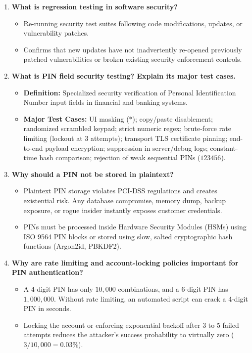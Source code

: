 \begin{enumerate}[label=\textbf{Q\arabic*.,resume},leftmargin=1.2cm]
\item \textbf{What is regression testing in software security?}
\begin{itemize}
\item Re-running security test suites following code modifications, updates, or vulnerability patches.
\item Confirms that new updates have not inadvertently re-opened previously patched vulnerabilities or broken existing security enforcement controls.
\end{itemize}

\item \textbf{What is PIN field security testing? Explain its major test cases.}
\begin{itemize}
\item \textbf{Definition:} Specialized security verification of Personal Identification Number input fields in financial and banking systems.
\item \textbf{Major Test Cases:} UI masking ($\ast$); copy/paste disablement; randomized scrambled keypad; strict numeric regex; brute-force rate limiting (lockout at 3 attempts); transport TLS certificate pinning; end-to-end payload encryption; suppression in server/debug logs; constant-time hash comparison; rejection of weak sequential PINs ($123456$).
\end{itemize}

\item \textbf{Why should a PIN not be stored in plaintext?}
\begin{itemize}
\item Plaintext PIN storage violates PCI-DSS regulations and creates existential risk. Any database compromise, memory dump, backup exposure, or rogue insider instantly exposes customer credentials.
\item PINs must be processed inside Hardware Security Modules (HSMs) using ISO 9564 PIN blocks or stored using slow, salted cryptographic hash functions (Argon2id, PBKDF2).
\end{itemize}

\item \textbf{Why are rate limiting and account-locking policies important for PIN authentication?}
\begin{itemize}
\item A 4-digit PIN has only $10,000$ combinations, and a 6-digit PIN has $1,000,000$. Without rate limiting, an automated script can crack a 4-digit PIN in seconds.
\item Locking the account or enforcing exponential backoff after 3 to 5 failed attempts reduces the attacker's success probability to virtually zero ($3 / 10,000 = 0.03\%$).
\end{itemize}


\end{enumerate}
